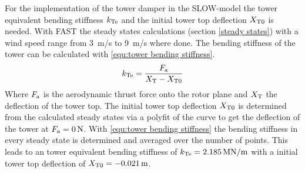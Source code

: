 For the implementation of the tower damper in the \gls{SLOW}-model the tower equivalent bending stiffness $k_\textnormal{Te}$ and the initial tower top deflection $X_\textnormal{T0}$ is needed. 
With \gls{FAST} the steady states calculations (section \ref{steady states}) with a wind speed range from \SI{3}{m/s} to \SI{9}{m/s} where done.
The bending stiffness of the tower can be calculated with \ref{equ:tower bending stiffness}.
\begin{equation}
	k_{\textnormal{Te}} = \frac{F_\textnormal{a}}{X_\textnormal{T} - X_{\textnormal{T0}}}
	\label{equ:tower bending stiffness}
\end{equation}
Where $F_\textnormal{a}$ is the aerodynamic thrust force onto the rotor plane and $X_\textnormal{T}$ the deflection of the tower top.
The initial tower top deflection $X_\textnormal{T0}$ is determined from the calculated steady states via a polyfit of the curve to get the deflection of the tower at $F_\textnormal{a} = \SI{0}{N}$.
With \ref{equ:tower bending stiffness} the bending stiffness in every steady state is determined and averaged over the number of points. 
This leads to an tower equivalent bending stiffness of $k_\textnormal{Te} = \SI{2.185}{\mega \newton /\meter}$ with a initial tower top deflection of $X_\textnormal{T0} = \SI{-0.021}{m}$.
